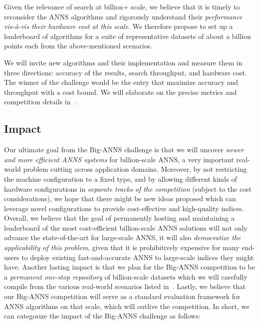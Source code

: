 Given the relevance of search at billion+ scale, we believe that
it is timely to reconsider the ANNS algorithms and rigorously understand their \emph{performance
vis-\`a-vis their hardware cost at this scale}. We therefore propose to
set up a leaderboard of algorithms for a suite of representative
datasets of about a billion points each from the above-mentioned scenarios.

We will invite new algorithms and their implementation and measure
them in three directions: accuracy of the results, search throughput,
and hardware cost.  The winner of the challenge would be the entry
that maximize accuracy and throughput with a cost bound.  We will
elaborate on the precise metrics and competition details
in~.
 


\subsection{Impact}

Our ultimate goal from the Big-ANNS challenge is that we will uncover
\emph{newer and more efficient ANNS systems} for billion-scale ANNS, a
very important real-world problem cutting across application
domains. Moreover, by not restricting the machine configuration to a
fixed type, and by allowing different kinds of hardware configurations in \emph{separate tracks of the competition}
(subject to the cost considerations), we hope that there might be new
ideas proposed which can leverage novel configurations to provide
cost-effective and high-quality indices. 
Overall, we believe that the goal of permanently hosting and maintaining a leaderboard of the most cost-efficient billion-scale ANNS solutions  will not only advance the state-of-the-art for large-scale ANNS, it will also
\emph{democratize the applicability of this problem}, given that it is
prohibitively expensive for many end-users to deploy existing
fast-and-accurate ANNS to large-scale indices they might have.
Another lasting impact is that we plan for the Big-ANNS
competition to be a \emph{permanent one-stop repository} of
billion-scale datasets which we will carefully compile from the various
real-world scenarios listed in~. 
Lastly, we believe that our Big-ANNS competition will serve as a standard evaluation framework for 
ANNS algorithms on that scale, which will outlive the competition.
In short, we can categorize the
impact of the Big-ANNS challenge as follows:

